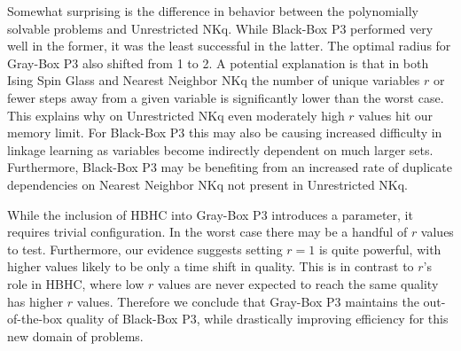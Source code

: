 \documentclass{sig-alternate}
\begin{document}
Somewhat surprising is the difference in behavior between the polynomially solvable problems
and Unrestricted NKq. While Black-Box P3 performed very well in the former, it was the least
successful in the latter. The optimal radius for Gray-Box P3 also shifted from 1 to 2.
A potential explanation is that in both Ising Spin Glass
and Nearest Neighbor NKq the number of unique variables $r$
or fewer steps away from a given variable is significantly lower than the worst case. This explains why on Unrestricted NKq
even moderately high $r$ values hit our memory limit.
For Black-Box P3 this may also be causing increased difficulty in linkage learning as variables
become indirectly dependent on much larger sets. Furthermore, Black-Box
P3 may be benefiting from an increased rate of duplicate dependencies on Nearest Neighbor NKq
not present in Unrestricted NKq.

While the inclusion of HBHC into Gray-Box P3 introduces a parameter, it requires
trivial configuration. In the worst case there may be a handful of $r$ values to test.
Furthermore, our evidence suggests setting $r=1$ is quite powerful, with higher values
likely to be only a time shift in quality. This is in contrast to $r$'s role in HBHC,
where low $r$ values are never expected to reach the same quality has higher $r$ values.
Therefore we conclude that Gray-Box P3 maintains the out-of-the-box quality of Black-Box
P3, while drastically improving efficiency for this new domain of problems.

%

%
%
\balancecolumns
\end{document}
